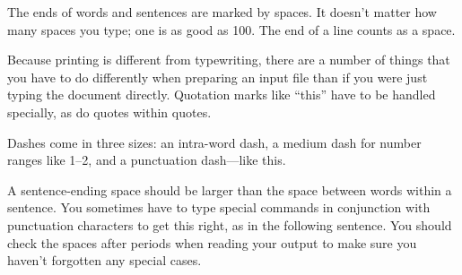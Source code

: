 \documentclass{article}
\begin{document}
The ends  of words and sentences are marked
  by   spaces. It  doesn't matter how many
spaces    you type; one is as good as 100.  The
end of   a line counts as a space.

Because printing is different from typewriting,
there are a number of things that you have to do
differently when preparing an input file than if
you were just typing the document directly.
Quotation marks like
       ``this''
have to be handled specially, as do quotes within
quotes.

Dashes come in three sizes: an
       intra-word
dash, a medium dash for number ranges like
       1--2,
and a punctuation
       dash---like
this.

A sentence-ending space should be larger than the
space between words within a sentence.  You
sometimes have to type special commands in
conjunction with punctuation characters to get
this right, as in the following sentence.
You should check the spaces after periods when
reading your output to make sure you haven't
forgotten any special cases.
\end{document}
